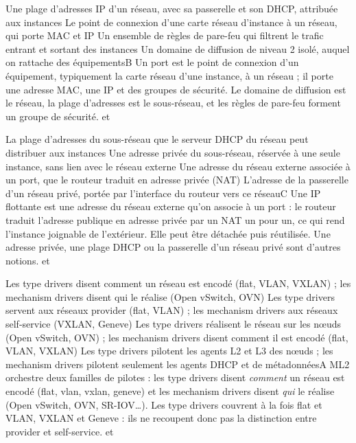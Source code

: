   {Une plage d'adresses IP d'un réseau, avec sa passerelle et son DHCP, attribuée aux instances}
  {Le point de connexion d'une carte réseau d'instance à un réseau, qui porte MAC et IP}
  {Un ensemble de règles de pare-feu qui filtrent le trafic entrant et sortant des instances}
  {Un domaine de diffusion de niveau 2 isolé, auquel on rattache des équipements}{B}
  {Un port est le point de connexion d'un équipement, typiquement la carte réseau d'une instance, à un réseau ; il porte une adresse MAC, une IP et des groupes de sécurité. Le domaine de diffusion est le réseau, la plage d'adresses est le sous-réseau, et les règles de pare-feu forment un groupe de sécurité.}
  { et }

  {La plage d'adresses du sous-réseau que le serveur DHCP du réseau peut distribuer aux instances}
  {Une adresse privée du sous-réseau, réservée à une seule instance, sans lien avec le réseau externe}
  {Une adresse du réseau externe associée à un port, que le routeur traduit en adresse privée (NAT)}
  {L'adresse de la passerelle d'un réseau privé, portée par l'interface du routeur vers ce réseau}{C}
  {Une IP flottante est une adresse du réseau externe qu'on associe à un port : le routeur traduit l'adresse publique en adresse privée par un NAT un pour un, ce qui rend l'instance joignable de l'extérieur. Elle peut être détachée puis réutilisée. Une adresse privée, une plage DHCP ou la passerelle d'un réseau privé sont d'autres notions.}
  { et }

  {Les type drivers disent comment un réseau est encodé (flat, VLAN, VXLAN) ; les mechanism drivers disent qui le réalise (Open vSwitch, OVN)}
  {Les type drivers servent aux réseaux provider (flat, VLAN) ; les mechanism drivers aux réseaux self-service (VXLAN, Geneve)}
  {Les type drivers réalisent le réseau sur les nœuds (Open vSwitch, OVN) ; les mechanism drivers disent comment il est encodé (flat, VLAN, VXLAN)}
  {Les type drivers pilotent les agents L2 et L3 des nœuds ; les mechanism drivers pilotent seulement les agents DHCP et de métadonnées}{A}
  {ML2 orchestre deux familles de pilotes : les type drivers disent \emph{comment} un réseau est encodé (flat, vlan, vxlan, geneve) et les mechanism drivers disent \emph{qui} le réalise (Open vSwitch, OVN, SR-IOV\dots). Les type drivers couvrent à la fois flat et VLAN, VXLAN et Geneve : ils ne recoupent donc pas la distinction entre provider et self-service.}
  { et }

